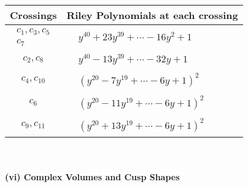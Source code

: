 \documentclass[1p]{elsarticle_modified}
\theoremstyle{definition}
\begin{document}
\begin{tabular}{m{50pt}|m{274pt}}
Crossings & \hspace{64pt}Riley Polynomials at each crossing \\
\hline $$\begin{aligned}c_{1},c_{3},c_{5}\\c_{7}\end{aligned}$$&$\begin{aligned}
&y^{40}+23 y^{39}+\cdots-16 y^2+1
\end{aligned}$\\
\hline $$\begin{aligned}c_{2},c_{8}\end{aligned}$$&$\begin{aligned}
&y^{40}-13 y^{39}+\cdots-32 y+1
\end{aligned}$\\
\hline $$\begin{aligned}c_{4},c_{10}\end{aligned}$$&$\begin{aligned}
&(y^{20}-7 y^{19}+\cdots-6 y+1)^{2}
\end{aligned}$\\
\hline $$\begin{aligned}c_{6}\end{aligned}$$&$\begin{aligned}
&(y^{20}-11 y^{19}+\cdots-6 y+1)^{2}
\end{aligned}$\\
\hline $$\begin{aligned}c_{9},c_{11}\end{aligned}$$&$\begin{aligned}
&(y^{20}+13 y^{19}+\cdots-6 y+1)^{2}
\end{aligned}$\\
\hline
\end{tabular}\\~\\
\newpage\flushleft \textbf{(vi) Complex Volumes and Cusp Shapes}
\end{document}
